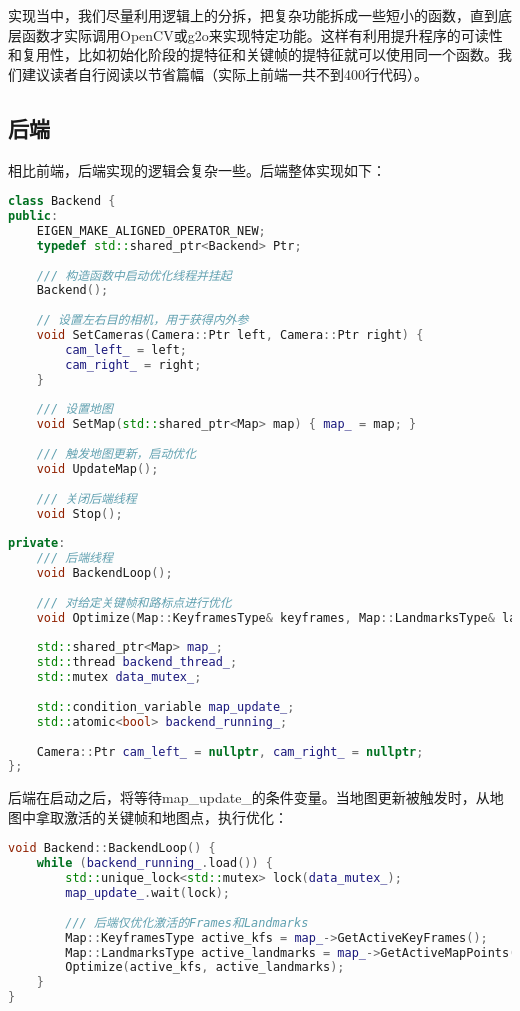 实现当中，我们尽量利用逻辑上的分拆，把复杂功能拆成一些短小的函数，直到底层函数才实际调用OpenCV或g2o来实现特定功能。这样有利用提升程序的可读性和复用性，比如初始化阶段的提特征和关键帧的提特征就可以使用同一个函数。我们建议读者自行阅读以节省篇幅（实际上前端一共不到400行代码）。

\subsection{后端}
相比前端，后端实现的逻辑会复杂一些。后端整体实现如下：
\begin{lstlisting}[language=c++,caption=slambook2/ch13/include/myslam/backend.h]
class Backend {
public:
    EIGEN_MAKE_ALIGNED_OPERATOR_NEW;
    typedef std::shared_ptr<Backend> Ptr;
    
    /// 构造函数中启动优化线程并挂起
    Backend();
    
    // 设置左右目的相机，用于获得内外参
    void SetCameras(Camera::Ptr left, Camera::Ptr right) {
        cam_left_ = left;
        cam_right_ = right;
    }
    
    /// 设置地图
    void SetMap(std::shared_ptr<Map> map) { map_ = map; }
    
    /// 触发地图更新，启动优化
    void UpdateMap();
    
    /// 关闭后端线程
    void Stop();
    
private:
    /// 后端线程
    void BackendLoop();
    
    /// 对给定关键帧和路标点进行优化
    void Optimize(Map::KeyframesType& keyframes, Map::LandmarksType& landmarks);
    
    std::shared_ptr<Map> map_;
    std::thread backend_thread_;
    std::mutex data_mutex_;
    
    std::condition_variable map_update_;
    std::atomic<bool> backend_running_;
    
    Camera::Ptr cam_left_ = nullptr, cam_right_ = nullptr;
};
\end{lstlisting}

后端在启动之后，将等待map\_update\_的条件变量。当地图更新被触发时，从地图中拿取激活的关键帧和地图点，执行优化：

\begin{lstlisting}[language=c++,caption=slambook2/ch13/src/backend.cpp]
void Backend::BackendLoop() {
    while (backend_running_.load()) {
        std::unique_lock<std::mutex> lock(data_mutex_);
        map_update_.wait(lock);
        
        /// 后端仅优化激活的Frames和Landmarks
        Map::KeyframesType active_kfs = map_->GetActiveKeyFrames();
        Map::LandmarksType active_landmarks = map_->GetActiveMapPoints();
        Optimize(active_kfs, active_landmarks);
    }
}
\end{lstlisting}

